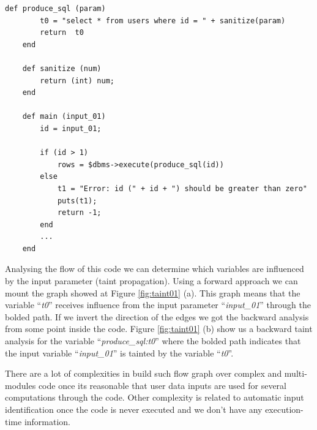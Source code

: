 \begin{lstlisting}[caption=Example code for Taint Analysis,label=cod:tai01]
	def produce_sql (param)
		t0 = "select * from users where id = " + sanitize(param)
		return  t0
	end

	def sanitize (num)
		return (int) num;
	end

	def main (input_01)
		id = input_01;
		
		if (id > 1)
			rows = $dbms->execute(produce_sql(id))
		else
			t1 = "Error: id (" + id + ") should be greater than zero"
			puts(t1);
			return -1;
		end
		...
	end
\end{lstlisting}

Analysing the flow of this code we can determine which variables are influenced by the input parameter (taint propagation). Using a forward approach we can mount the graph showed at Figure \ref{fig:taint01} (a). This graph means that the variable ``\textit{t0}'' receives influence from the input parameter ``\textit{input\_01}'' through the bolded path. If we invert the direction of the edges we got the backward analysis from some point inside the code. Figure \ref{fig:taint01} (b) show us a backward taint analysis for the variable ``\textit{produce\_sql:t0}'' where the bolded path indicates that the input variable ``\textit{input\_01}'' is tainted by the variable ``\textit{t0}''.

There are a lot of complexities in build such flow graph over complex and multi-modules code once its reasonable that user data inputs are used for several computations through the code. Other complexity is related to automatic input identification once the code is never executed and we don't have any execution-time information.

